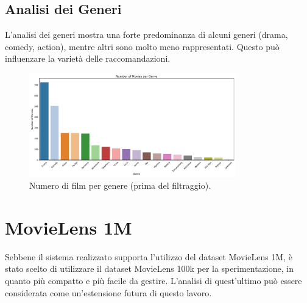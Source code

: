 \subsection{Analisi dei Generi}
L'analisi dei generi mostra una forte predominanza di alcuni generi (drama, comedy, action), mentre altri sono molto meno rappresentati. Questo può influenzare la varietà delle raccomandazioni.

\begin{figure}[H]
    \centering
    \includegraphics[width=0.8\textwidth]{../output/eda/before_cut/before_movies_per_genre.png}
    \caption{Numero di film per genere (prima del filtraggio).}
\end{figure}

\section{MovieLens 1M}

Sebbene il sistema realizzato supporta l'utilizzo del dataset MovieLens 1M, è stato scelto di utilizzare il dataset MovieLens 100k per la sperimentazione, in quanto più compatto e più facile da gestire. L'analisi di quest'ultimo può essere considerata come un'estensione futura di questo lavoro.
